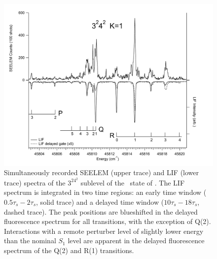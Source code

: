 \documentclass[12pt]{mitthesis}
\begin{document}
\begin{figure}
  \caption{Simultaneously recorded SEELEM (upper trace) and LIF (lower
    trace) spectra of the $3^24^2$  sublevel of the \astate\
    state of .  The LIF spectrum is integrated in two time
    regions: an early time window ($0.5\tau_s-2\tau_s$, solid trace)
    and a delayed time window ($10\tau_s-18\tau_s$, dashed trace).
    The peak positions are blueshifted in the delayed fluorescence
    spectrum for all transitions, with the exception of Q(2).
    Interactions with a remote perturber level of slightly lower
    energy than the nominal $S_1$ level are apparent in the delayed
    fluorescence spectrum of the Q(2) and R(1) transitions.}
  \label{fig:spectrum-32b2}
  \centering
  \includegraphics[width=7in,angle=90]{spectrum-3242-p3r4.pdf}
\end{figure}
\end{document}
